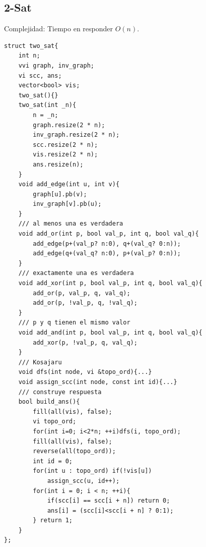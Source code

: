 \subsection{2-Sat}
Complejidad: Tiempo en responder $O(n)$.
\begin{verbatim}
struct two_sat{
    int n;
    vvi graph, inv_graph;
    vi scc, ans;
    vector<bool> vis;
    two_sat(){}
    two_sat(int _n){
        n = _n;
        graph.resize(2 * n);
        inv_graph.resize(2 * n);
        scc.resize(2 * n);
        vis.resize(2 * n);
        ans.resize(n);
    }
    void add_edge(int u, int v){
        graph[u].pb(v);
        inv_graph[v].pb(u);
    }
    /// al menos una es verdadera
    void add_or(int p, bool val_p, int q, bool val_q){
        add_edge(p+(val_p? n:0), q+(val_q? 0:n));
        add_edge(q+(val_q? n:0), p+(val_p? 0:n));
    }
    /// exactamente una es verdadera
    void add_xor(int p, bool val_p, int q, bool val_q){
        add_or(p, val_p, q, val_q);
        add_or(p, !val_p, q, !val_q);
    }
    /// p y q tienen el mismo valor
    void add_and(int p, bool val_p, int q, bool val_q){
        add_xor(p, !val_p, q, val_q);
    }
    /// Kosajaru
    void dfs(int node, vi &topo_ord){...}
    void assign_scc(int node, const int id){...}
    /// construye respuesta
    bool build_ans(){
        fill(all(vis), false);
        vi topo_ord;
        for(int i=0; i<2*n; ++i)dfs(i, topo_ord);
        fill(all(vis), false);
        reverse(all(topo_ord));
        int id = 0;
        for(int u : topo_ord) if(!vis[u])
            assign_scc(u, id++);
        for(int i = 0; i < n; ++i){
            if(scc[i] == scc[i + n]) return 0;
            ans[i] = (scc[i]<scc[i + n] ? 0:1);
        } return 1;
    }
};
\end{verbatim}